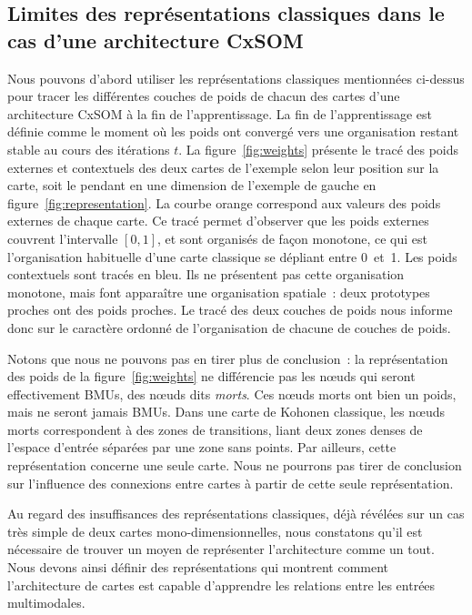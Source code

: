 \documentclass[../main]{subfiles}
\begin{document}
\subsection{Limites des représentations classiques dans le cas d'une architecture CxSOM}

Nous pouvons d'abord utiliser les représentations classiques mentionnées ci-dessus pour tracer les différentes couches de poids de chacun des cartes d'une architecture CxSOM à la fin de l'apprentissage.
La fin de l'apprentissage est définie comme le moment où les poids ont convergé vers une organisation restant stable au cours des itérations $t$.
La figure~\ref{fig:weights} présente le tracé des poids externes et contextuels des deux cartes de l'exemple selon leur position sur la carte, soit le pendant en une dimension de l'exemple de gauche en figure~\ref{fig:representation}.
La courbe orange correspond aux valeurs des poids externes de chaque carte.
Ce tracé permet d'observer que les poids externes couvrent l'intervalle $[0,1]$, et sont organisés de façon monotone, ce qui est l'organisation habituelle d'une carte classique se dépliant entre 0~et~1.
Les poids contextuels sont tracés en bleu. Ils ne présentent pas cette organisation monotone, mais font apparaître une organisation spatiale~: deux prototypes proches ont des poids proches. 
Le tracé des deux couches de poids nous informe donc sur le caractère ordonné de l'organisation de chacune de couches de poids. 

Notons que nous ne pouvons pas en tirer plus de conclusion~: la représentation des poids de la figure~\ref{fig:weights} ne différencie pas les n\oe{}uds qui seront effectivement BMUs, des n\oe{}uds dits \emph{morts}.
Ces n\oe{}uds morts ont bien un poids, mais ne seront jamais BMUs.
Dans une carte de Kohonen classique, les n\oe{}uds morts correspondent à des zones de transitions, liant deux zones denses de l'espace d'entrée séparées par une zone sans points.
Par ailleurs, cette représentation concerne une seule carte. Nous ne pourrons pas tirer de conclusion sur l'influence des connexions entre cartes à partir de cette seule représentation.

Au regard des insuffisances des représentations classiques, déjà révélées sur un cas très simple de deux cartes mono-dimensionnelles, nous constatons qu'il est nécessaire de trouver un moyen de représenter l'architecture comme un tout. Nous devons ainsi définir des représentations qui montrent comment l'architecture de cartes est capable d'apprendre les relations entre les entrées multimodales.
\end{document}
